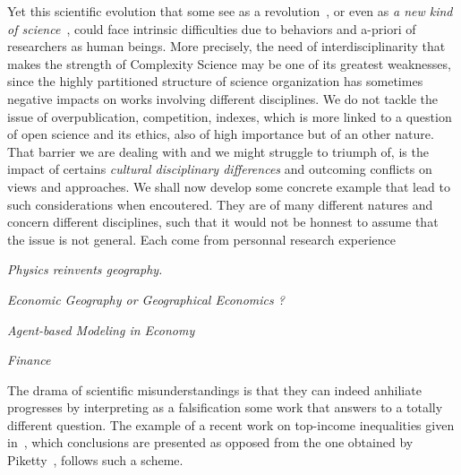 Yet this scientific evolution that some see as a revolution~\cite{colander2003complexity}, or even as \emph{a new kind of science}~\cite{wolfram2002new}, could face intrinsic difficulties due to behaviors and a-priori of researchers as human beings. More precisely, the need of interdisciplinarity that makes the strength of Complexity Science may be one of its greatest weaknesses, since the highly partitioned structure of science organization has sometimes negative impacts on works involving different disciplines. We do not tackle the issue of overpublication, competition, indexes, which is more linked to a question of open science and its ethics, also of high importance but of an other nature. That barrier we are dealing with and we might struggle to triumph of, is the impact of certains \emph{cultural disciplinary differences} and outcoming conflicts on views and approaches. We shall now develop some concrete example that lead to such considerations when encoutered. They are of many different natures and concern different disciplines, such that it would not be honnest to assume that the issue is not general. Each come from personnal research experience


\textit{Physics reinvents geography.} 



\textit{Economic Geography or Geographical Economics ?}



\textit{Agent-based Modeling in Economy}


\textit{Finance}



The drama of scientific misunderstandings is that they can indeed anhiliate progresses by interpreting as a falsification some work that answers to a totally different question. The example of a recent work on top-income inequalities given in~\cite{aghion2015innovation}, which conclusions are presented as opposed from the one obtained by Piketty~\cite{piketty2013capital}, follows such a scheme.







\footnotesize





